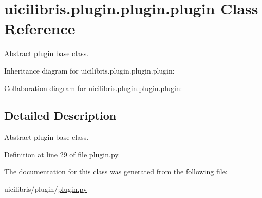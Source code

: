 \hypertarget{classuicilibris_1_1plugin_1_1plugin_1_1plugin}{\section{uicilibris.\-plugin.\-plugin.\-plugin \-Class \-Reference}
\label{classuicilibris_1_1plugin_1_1plugin_1_1plugin}
}


\-Abstract plugin base class.  




\-Inheritance diagram for uicilibris.\-plugin.\-plugin.\-plugin\-:


\-Collaboration diagram for uicilibris.\-plugin.\-plugin.\-plugin\-:


\subsection{\-Detailed \-Description}
\-Abstract plugin base class. 



\-Definition at line 29 of file plugin.\-py.



\-The documentation for this class was generated from the following file\-:\begin{DoxyCompactItemize}
\item 
uicilibris/plugin/\hyperlink{plugin_8py}{plugin.\-py}\end{DoxyCompactItemize}
